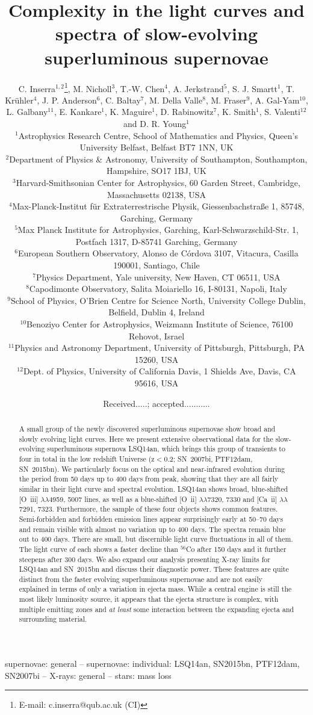 \documentclass[useAMS,usenatbib]{mn2e}
\title[slow-evolving SLSNe I]{Complexity in the light curves and spectra of slow-evolving superluminous supernovae}
\author[C. Inserra et al.]{C. Inserra$^{1,2}$\thanks{E-mail: c.inserra@qub.ac.uk (CI)},
M. Nicholl$^{3}$,
T.-W. Chen$^{4}$, A. Jerkstrand$^{5}$, S. J. Smartt$^{1}$, T. Kr\"{u}hler$^{4}$,
\newauthor J. P. Anderson$^{6}$, C. Baltay$^{7}$, M. Della Valle$^{8}$,  M. Fraser$^{9}$, A. Gal-Yam$^{10}$, L. Galbany$^{11}$,
\newauthor E. Kankare$^{1}$, K. Maguire$^{1}$, D. Rabinowitz$^{7}$, K. Smith$^{1}$, S. Valenti$^{12}$ and D. R. Young$^{1}$
\\
$^{1}$Astrophysics Research Centre, School of Mathematics and Physics, Queen's University
  Belfast, Belfast BT7 1NN, UK\\
$^{2}$Department of Physics \& Astronomy, University of Southampton, Southampton, Hampshire, SO17 1BJ, UK\\
$^{3}$Harvard-Smithsonian Center for Astrophysics, 60 Garden Street, Cambridge, Massachusetts 02138, USA\\
$^{4}$Max-Planck-Institut f{\"u}r Extraterrestrische Physik, Giessenbachstra\ss e 1, 85748, Garching, Germany\\
$^{5}$Max Planck Institute for Astrophysics, Garching, Karl-Schwarzschild-Str. 1, Postfach 1317, D-85741 Garching, Germany\\
$^{6}$European Southern Observatory, Alonso de C\'ordova 3107, Vitacura, Casilla 190001, Santiago, Chile\\
$^{7}$Physics Department, Yale university, New Haven, CT 06511, USA\\
$^{8}$Capodimonte Observatory, Salita Moiariello 16, I-80131, Napoli, Italy\\
$^{9}$School of Physics, O'Brien Centre for Science North, University College Dublin, Belfield, Dublin 4, Ireland\\
$^{10}$Benoziyo Center for Astrophysics, Weizmann Institute of Science, 76100 Rehovot, Israel\\
$^{11}$Physics and Astronomy Department, University of Pittsburgh, Pittsburgh, PA 15260, USA\\
$^{12}$Dept. of Physics, University of California Davis, 1 Shields Ave, Davis, CA 95616, USA
}
\def\co{$^{56}$Co}
\begin{document}
\date{Received.....; accepted...........}

\pagerange{\pageref{firstpage}--\pageref{lastpage}} \pubyear{}

\maketitle

\label{firstpage}

\begin{abstract}
A small group of the newly discovered superluminous supernovae show broad and slowly evolving light curves. 
Here we present  extensive observational data for the slow-evolving superluminous supernova
LSQ14an, which brings this group of transients to four in total in the low redshift Universe (z$<$0.2; SN~2007bi, PTF12dam, SN~2015bn). 
We particularly focus on the optical and near-infrared evolution during the 
period from 50 days up to 400 days from peak, showing that  they are all fairly similar in their light curve and spectral evolution. 
LSQ14an 
shows broad, blue-shifted [O~{\sc iii}] $\lambda\lambda$4959, 5007 lines, as well as a blue-shifted [O~{\sc ii}] $\lambda\lambda$7320, 7330 and [Ca~{\sc ii}] $\lambda\lambda$7291, 7323. 
Furthermore, the sample of these four objects shows common features. 
Semi-forbidden and forbidden emission lines appear surprisingly early at 50--70 days and remain visible with almost no variation up to 400 days.  The spectra remain blue out to 400 days. There 
are small, but discernible light curve fluctuations in all of them. 
 The light curve of each shows a faster decline than \co\/ after 150 days and it further steepens after 300 days.  We also expand our analysis presenting X-ray limits for LSQ14an and SN~2015bn and discuss their diagnostic power. 
 These features are quite distinct from the 
faster evolving superluminous supernovae and are not easily explained in terms of only a variation in ejecta mass. 
While a central engine is still the most likely luminosity source, it appears that the ejecta structure is complex, with multiple emitting zones and {\it at least} some interaction between the 
expanding ejecta and surrounding material. 
 \end{abstract}

\begin{keywords}
supernovae: general -- supernovae: individual: LSQ14an, SN2015bn, PTF12dam, SN2007bi -- X-rays: general -- stars: mass loss
\end{keywords}
\end{document}
